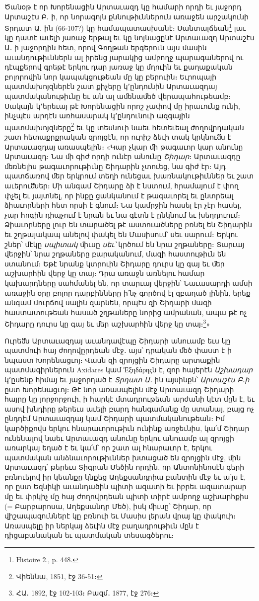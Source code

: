 \documentclass{article}
\begin{document}
{Ծանօթ է որ Խորենացին Արտաւազդ կը համարի որդի եւ յաջորդ Արտաշէս Բ․ ի, որ նորագոյն քննութիւններուն առաջեն արշակունի Տրդատ Ա․ ին (66֊107?) կը համապատասխանէ։ Սանտալճեան\footnote{Histoire 2., p. 448.} լաւ կը դատէ աւելի յառաջ երթալ եւ կը նոյնացընէ Արտաւազդ Արտաշէս Ա․ ի յաջորդին հետ, որով Գողթան երգերուն այս մասին աւանդութիւններն ալ իրենց յարակից ամբողջ պարագաներով ու դէպքերով գրեթէ երկու դար յառաջ կը մղուին եւ քաղաքական բոլորովին նոր կապակցութեան մը կը բերուին։ Եւրոպայի պատմախոյզներէն շատ քիչերը կ՚ընդունին Արտաւազդայ պատմականութիւնը եւ ան ալ աﬔնաﬔծ վերապահութեամբ։ Սակայն կ՚երեւայ թէ Խորենացին որոշ չափով մը իրաւունք ունի, ինչպէս արդէն առհասարակ կ՚ընդունուի ազգային պատմախոյզները\footnote{Վիեննա, 1851, էջ 36֊51։} եւ կը տեսնուի նաեւ հետեւեալ ժողովրդական շատ հետաքրքրական զրոյցէն, որ ուրիշ ձեւի տակ կրկնուﬓ է Արտաւազդայ առասպելին։ «Կար չկար ﬕ թագաւոր կար անունը Արտաւազդ։ Նա ﬕ գիժ որդի ունէր անունը \emph{Շիդար}։ Արտաւազդը ﬔռնելիս թագաւորութիւնը Շիդարին չտուեց, նա գիժ էր։ Այդ պատճառով ﬔր երկրում տեղի ունեցաւ խառնակութիւններ եւ շատ աւերուﬓեր։ Մի անգամ Շիդարը ձի է նստում, հրամայում է փող փչել եւ յայտնել, որ ինքը ցանկանում է թագաւորել եւ ընտրեալ ձիաւորների հետ որսի է գնում։ Նա կամրջին հասել էր չէր հասել, չար հոգին դիպչում է նրան եւ նա գէտն է ընկնում եւ խեղդուում։ Ձիաւորները լուր են տարածել թէ աստուածները բռնել են Շիդարին եւ շղթայակապ անելով փակել են Մասիսում՝ սեւ սարում։ Երկու շներ՝ մէկը \emph{սպիտակ} ﬕւսը \emph{սեւ՝} կրծում են նրա շղթաները։ Տարւայ վերջին՝ նրա շղթաները բարականում, մազի հաստութիւն են ստանում։ Եթէ նրանք կտրուին Շիդարը դուրս կը գայ եւ ﬔր աշխարհին վերջ կը տայ։ Դրա առաջն առնելու համար կախարդները սահմանել են, որ տարւայ վերջին՝ Նաւասարդի ամսի առաջին օրը բոլոր դարբինները ի՛նչ գործով էլ զբաղած լինին, երեք անգամ մուրճով սալին զարնեն, որպէս զի Շիդարի մազի հաստատութեան հասած շղթաները նորից ամրանան, ապա թէ ոչ Շիդարը դուրս կը գայ եւ ﬔր աշխարհին վերջ կը տայ։\footnote{ՀԱ․ 1892, էջ 102֊103։ Բազմ․ 1877, էջ 276։}»

Ուրեﬓ Արտաւազդայ աւանդավէպը Շիդարի անուամբ եւս կը պատմուի հայ ժողովըրդեան մէջ․ այս՝ դրական ﬔծ փաստ է ի նպաստ Խորենացւոյ։ Վասն զի զրոյցին Շիդարը արտաքին պատմագիրներուն Axidares կամ Ἐξηδάρηςն է, զոր հայերէն \emph{Աշխադար} կ՚ըսենք հիմայ եւ յաջորդած է \emph{Տրդատ Ա․} ին այսինքն՝ \emph{Արտաշէս Բ․ի} ըստ Խորենացւոյ։ Թէ նոր առասպելին մէջ Արտաւազդ Շիդարի հայրը կը յորջորջուի, ի հարկէ մտադրութեան արժանի կէտ մըն է, եւ ասով խնդիրը թերեւս աւելի բարդ հանգամանք մը ստանայ, բայց ոչ ընդդէմ Արտաւազդայ կամ Շիդարի պատմականութեան։ Իմ կարծիքովս երկու հնարաւորութիւն ունինք առջեւնիս, կա՛մ Շիդար ունենալով նաեւ Արտաւազդ անունը երկու անուամբ ալ զրոյցի առարկայ եղած է եւ կա՛մ՝ որ շատ ալ հնարաւոր է, երկու պատմական անձնաւորութիւններ խտացած են զրոյցին մէջ, ﬕն Արտաւազդ՝ թերեւս Տիգրան Մեծին որդին, որ Անտոնինոսէն գերի բռնուելով իր կեանքը կնքեց Աղեքսանդրիա բանտին մէջ եւ ա՛յս է, որ ըստ Եզնիկի աւանդածին պիտի ազատի եւ իբրեւ ազատարար մը եւ փրկիչ մը հայ ժողովրդեան պիտի տիրէ ամբողջ աշխարհքիս (= Բարբարոսա, Աղեքսանդր Մեծ), իսկ ﬕւսը՝ Շիդար, որ վիշապազուններէ կը բռնուի եւ Մասիս լերան վրայ կը փակուի։ Առասպելը իր ներկայ ձեւին մէջ բաղադրութիւն մըն է դիցաբանական եւ պատմական տեսագծերու։

}
\end{document}
